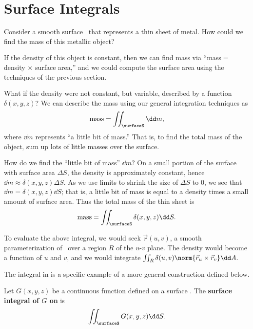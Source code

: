 \section{Surface Integrals}\label{sec:surface_integral}

Consider a smooth surface \surfaceS\ that represents a thin sheet of metal. How could we find the mass of this metallic object?

If the density of this object is constant, then we can find mass via ``mass$=$ density $\times$ surface area,'' and we could compute the surface area using the techniques of the previous section. 

What if the density were not constant, but variable, described by a function $\delta(x,y,z)$? We can describe the mass using our general integration techniques as
\[\text{mass} = \iint_{\surfaceS} \dd m,\]
where $\dd m$ represents ``a little bit of mass.'' That is, to find the total mass of the object, sum up lots of little masses over the surface.

How do we find the ``little bit of mass'' $\dd m$? On a small portion of the surface with surface area $\Delta S$, the density is approximately constant, hence $\dd m \approx \delta(x,y,z)\Delta S$. As we use limits to shrink the size of $\Delta S$ to 0, we see that $\dd m = \delta(x,y,z)\dd S$; that is, a little bit of mass is equal to a density times a small amount of surface area. Thus the total mass of the thin sheet is
\begin{equation}
\text{mass} =\iint_{\surfaceS} \delta(x,y,z)\dd S.\label{eq:surface_int}
\end{equation}

To evaluate the above integral, we would seek $\vec r(u,v)$, a smooth parameterization of \surfaceS\ over a region $R$ of the $u$-$v$ plane. The density would become a function of $u$ and $v$, and we would integrate $\iint_R \delta(u,v)\norm{\vec r_u\times \vec r_v}\dd A.$

The integral in  is a specific example of a more general construction defined below.

\begin{definition}\label{def:surface_integral}%
Let $G(x,y,z)$ be a continuous function defined on a surface \surfaceS. The \textbf{surface integral of $G$ on \surfaceS} is
\[\iint_{\surfaceS} G(x,y,z)\dd S.\]
\end{definition}

